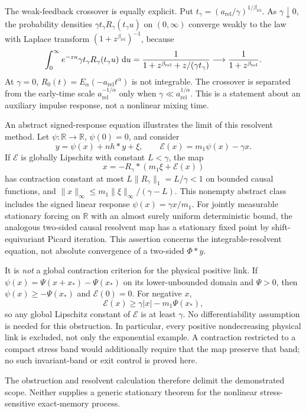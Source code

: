 The weak-feedback crossover is equally explicit. Put \(t_\gamma=(a_{\mathrm{rel}}/\gamma)^{1/\beta_{\mathrm{rel}}}\). As \(\gamma\downarrow0\), the probability densities \(\gamma t_\gamma R_\gamma(t_\gamma u)\) on \((0,\infty)\) converge weakly to the law with Laplace transform \((1+z^{\beta_{\mathrm{rel}}})^{-1}\), because
\[
\int_0^\infty e^{-zu}\gamma t_\gamma R_\gamma(t_\gamma u)\,\mathop{}\!\mathrm{d} u
=\frac{1}{1+z^{\beta_{\mathrm{rel}}}+z/(\gamma t_\gamma)}
\longrightarrow\frac{1}{1+z^{\beta_{\mathrm{rel}}}}.
\]
At \(\gamma=0\), \(R_0(t)=E_\alpha(-a_{\mathrm{rel}}t^\alpha)\) is not integrable. The crossover is separated from the early-time scale \(a_{\mathrm{rel}}^{-1/\alpha}\) only when \(\gamma\ll a_{\mathrm{rel}}^{1/\alpha}\). This is a statement about an auxiliary impulse response, not a nonlinear mixing time.

An abstract signed-response equation illustrates the limit of this resolvent method. Let \(\psi:\mathbb R\to\mathbb R\), \(\psi(0)=0\), and consider
\[
y=\psi(x)+nh*y+\xi,\qquad
\mathcal E(x)=m_1\psi(x)-\gamma x.
\]
If \(\mathcal E\) is globally Lipschitz with constant \(L<\gamma\), the map
\[
x=-R_\gamma*(m_1\xi+\mathcal E(x))
\]
has contraction constant at most \(L\|R_\gamma\|_1=L/\gamma<1\) on bounded causal functions, and
\(\|x\|_\infty\leq m_1\|\xi\|_\infty/(\gamma-L)\). This nonempty abstract class includes the signed linear response \(\psi(x)=\gamma x/m_1\). For jointly measurable stationary forcing on \(\mathbb R\) with an almost surely uniform deterministic bound, the analogous two-sided causal resolvent map has a stationary fixed point by shift-equivariant Picard iteration. This assertion concerns the integrable-resolvent equation, not absolute convergence of a two-sided \(\Phi*y\).

It is \emph{not} a global contraction criterion for the physical positive link. If \(\psi(x)=\Psi(x+x_*)-\Psi(x_*)\) on its lower-unbounded domain and \(\Psi>0\), then \(\psi(x)\geq-\Psi(x_*)\) and \(\mathcal E(0)=0\). For negative \(x\),
\[
\mathcal E(x)\geq\gamma|x|-m_1\Psi(x_*),
\]
so any global Lipschitz constant of \(\mathcal E\) is at least \(\gamma\). No differentiability assumption is needed for this obstruction. In particular, every positive nondecreasing physical link is excluded, not only the exponential example. A contraction restricted to a compact stress band would additionally require that the map preserve that band; no such invariant-band or exit control is proved here.

The obstruction and resolvent calculation therefore delimit the demonstrated scope. Neither supplies a generic stationary theorem for the nonlinear stress-sensitive exact-memory process.

